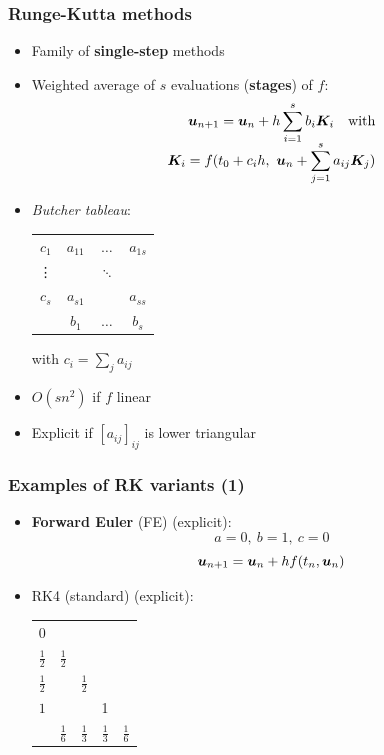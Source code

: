 \documentclass{beamer}
\begin{document}
\begin{frame} %
	\frametitle{Runge-Kutta methods}
	\begin{itemize}
		\item Family of \textbf{single-step} methods
		\item Weighted average of $s$ evaluations (\textbf{stages}) of $f$: \\[-20pt]
		\begin{align*}
			\boldsymbol u_{n+1} = \boldsymbol u_{n} + h \sum_{i=1}^s b_i \boldsymbol K_i \quad \text{with} \\[-5pt]
			\boldsymbol K_i = f(t_0 + c_i h, \ \boldsymbol u_n + \sum_{j=1}^s a_{ij} \boldsymbol K_j)
		\end{align*}
		\pause
		\vspace{-22pt}
		\item \textit{Butcher tableau}:
		\begin{center}
			\begin{tabular}{c|ccc}
				$c_1$ & $a_{11}$ & $\dots$ & $a_{1s}$ \\
				\vdots & & $\ddots$ & \\
				$c_s$ & $a_{s1}$ & & $a_{ss}$ \\
				\hline
				& $b_1$ & $\dots$ & $b_s$
			\end{tabular}
		\hspace{30pt} with $c_i = \sum_j a_{ij}$
		\pause
		\end{center}
		\item $O(s n^2)$ if $f$ linear
		\item Explicit if $[a_{ij}]_{ij}$ is lower triangular
	\end{itemize}
\end{frame}


\begin{frame} %
	\frametitle{Examples of RK variants (1)}
	\begin{itemize}
		\item \textbf{Forward Euler} (FE) (explicit):
		$$ a = 0, \ b = 1, \ c = 0 $$
		$$ \boldsymbol u_{n+1} = \boldsymbol u_{n} + h f(t_n, \boldsymbol u_n) $$
		\item RK4 (standard) (explicit): \\
		\begin{center}
			\begin{tabular}{c|cccc}
				$0$ & & & & \\
				$\frac 1 2$ & $\frac 1 2$ & & & \\
				$\frac 1 2$ & & $\frac 1 2$ & & \\
				$1$ & & & 1 & \\
				\hline
				& $\frac 1 6$ & $\frac 1 3$ & $\frac 1 3$ & $\frac 1 6$
				\end{tabular}
		\end{center}	
	\end{itemize}
\end{frame}
\end{document}
